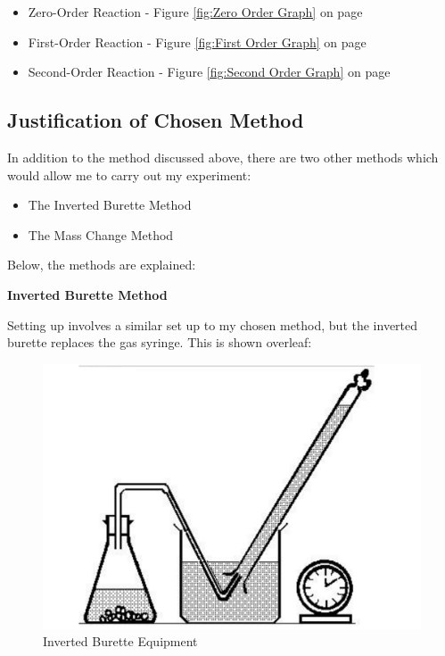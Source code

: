 \begin{itemize}
\item Zero-Order Reaction -  Figure \ref{fig:Zero Order Graph} on page \pageref{fig:Zero Order Graph}
\item First-Order Reaction -  Figure \ref{fig:First Order Graph} on page \pageref{fig:First Order Graph}
\item Second-Order Reaction -  Figure \ref{fig:Second Order Graph} on page \pageref{fig:Second Order Graph}
\end{itemize}


	\subsection{Justification of Chosen Method}

In addition to the method discussed above, there are two other methods which would allow me to carry out my experiment:
\begin{itemize}
\item The Inverted Burette Method
\item The Mass Change Method 
\end{itemize}

Below, the methods are explained:

\textbf{Inverted Burette Method}



Setting up involves a similar set up to my chosen method, but the inverted burette replaces the gas syringe. This is shown overleaf:

\begin{figure}[H]
    \includegraphics[width=\textwidth]{./Planning/Images/InvertedBurette.pdf}
    \caption{Inverted Burette Equipment} \label{fig:Inverted Burette}
\end{figure}


